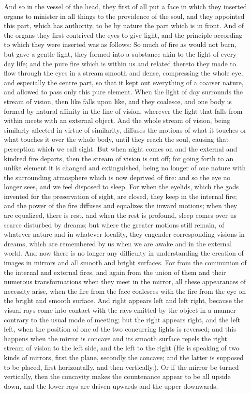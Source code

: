 And so in the vessel of the head, they first of all put a face in which
they inserted organs to minister in all things to the providence of the
soul, and they appointed this part, which has authority, to be by nature
the part which is in front. And of the organs they first contrived the
eyes to give light, and the principle according to which they were
inserted was as follows: So much of fire as would not burn, but gave a
gentle light, they formed into a substance akin to the light of every-day
life; and the pure fire which is within us and related thereto they made
to flow through the eyes in a stream smooth and dense, compressing the
whole eye, and especially the centre part, so that it kept out everything
of a coarser nature, and allowed to pass only this pure element. When the
light of day surrounds the stream of vision, then like falls upon like,
and they coalesce, and one body is formed by natural affinity in the line
of vision, wherever the light that falls from within meets with an
external object. And the whole stream of vision, being similarly affected
in virtue of similarity, diffuses the motions of what it touches or what
touches it over the whole body, until they reach the soul, causing that
perception which we call sight. But when night comes on and the external
and kindred fire departs, then the stream of vision is cut off; for going
forth to an unlike element it is changed and extinguished, being no longer
of one nature with the surrounding atmosphere which is now deprived of
fire: and so the eye no longer sees, and we feel disposed to sleep. For
when the eyelids, which the gods invented for the preservation of sight,
are closed, they keep in the internal fire; and the power of the fire
diffuses and equalizes the inward motions; when they are equalized, there
is rest, and when the rest is profound, sleep comes over us scarce
disturbed by dreams; but where the greater motions still remain, of
whatever nature and in whatever locality, they engender corresponding
visions in dreams, which are remembered by us when we are awake and in the
external world. And now there is no longer any difficulty in understanding
the creation of images in mirrors and all smooth and bright surfaces. For
from the communion of the internal and external fires, and again from the
union of them and their numerous transformations when they meet in the
mirror, all these appearances of necessity arise, when the fire from the
face coalesces with the fire from the eye on the bright and smooth
surface. And right appears left and left right, because the visual rays
come into contact with the rays emitted by the object in a manner contrary
to the usual mode of meeting; but the right appears right, and the left
left, when the position of one of the two concurring lights is reversed;
and this happens when the mirror is concave and its smooth surface repels
the right stream of vision to the left side, and the left to the right (He
is speaking of two kinds of mirrors, first the plane, secondly the
concave; and the latter is supposed to be placed, first horizontally, and
then vertically.). Or if the mirror be turned vertically, then the
concavity makes the countenance appear to be all upside down, and the
lower rays are driven upwards and the upper downwards.

